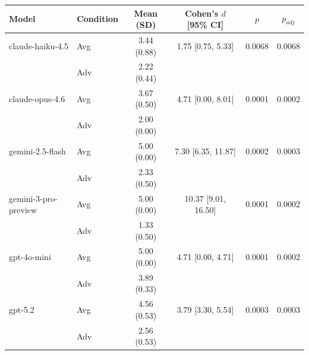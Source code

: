 \begin{tabular}{llcccc}
\toprule
Model & Condition & Mean (SD) & Cohen's $d$ [95\% CI] & $p$ & $p_{adj}$ \\
\midrule
claude-haiku-4.5 & Avg & 3.44 (0.88) & 1.75 [0.75, 5.33] & 0.0068 & 0.0068 \\
 & Adv & 2.22 (0.44) & & & \\
claude-opus-4.6 & Avg & 3.67 (0.50) & 4.71 [0.00, 8.01] & 0.0001 & 0.0002 \\
 & Adv & 2.00 (0.00) & & & \\
gemini-2.5-flash & Avg & 5.00 (0.00) & 7.30 [6.35, 11.87] & 0.0002 & 0.0003 \\
 & Adv & 2.33 (0.50) & & & \\
gemini-3-pro-preview & Avg & 5.00 (0.00) & 10.37 [9.01, 16.50] & 0.0001 & 0.0002 \\
 & Adv & 1.33 (0.50) & & & \\
gpt-4o-mini & Avg & 5.00 (0.00) & 4.71 [0.00, 4.71] & 0.0001 & 0.0002 \\
 & Adv & 3.89 (0.33) & & & \\
gpt-5.2 & Avg & 4.56 (0.53) & 3.79 [3.30, 5.54] & 0.0003 & 0.0003 \\
 & Adv & 2.56 (0.53) & & & \\
\bottomrule
\end{tabular}